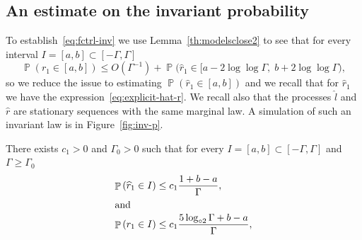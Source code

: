 \documentclass[AHL,Unicode,longabstracts,published]{cedram}
\newcommand{\gG}{\Gamma}
\newcommand{\ls}{\widehat{l}}
\newcommand{\rs}{\widehat{r}}
\newcommand{\loglog}{\log_{\circ 2}}
\DeclareMathOperator{\p}{\mathbb{P}}
\begin{document}
\subsection{An estimate on the invariant probability}\label{sec:nu}

To establish~\eqref{eq:fctrl-inv} we use Lemma~\ref{th:modelsclose2} to see that for every interval $I=[a, b] \subset [-\Gamma, \Gamma]$
\begin{equation}\label{eq:pre-obs-inv}
\p\left(r_1 \in [a, b]\right) \le O(\Gamma^{-1}) + \p\bigl(\widehat r_1 \in [a- 2 \log\log \gG,\; b+ 2\log \log \gG\bigr),
\end{equation}
so we reduce the issue to estimating $\p\left(\rs_1 \in [a, b]\right)$ and we recall that for $\rs_1$ we have the expression~\eqref{eq:explicit-hat-r}. We recall also that the processes $\ls$ and $\rs$ are stationary sequences with the same marginal law. A simulation of such an invariant law is in Figure~\ref{fig:inv-p}.

\begin{lemm}\label{th:ctrl-inv}
There exists $c_1>0$ and $\gG_0>0$ such that for every $I =[a, b]\subset [-\Gamma, \Gamma]$ and $\Gamma\ge \Gamma_0$
\begin{align}
\p\left(\widehat r_1\in I\right) &\le c_1 \frac{1+b-a}{\Gamma},\label{eq:ctrl-inv}
\\
\intertext{and}
\p\left(r_1\in I\right) &\le c_1 \frac{5\loglog \gG+b-a}{\Gamma},\label{eq:ctrl-inv2}
\end{align}
\end{lemm}
\end{document}
